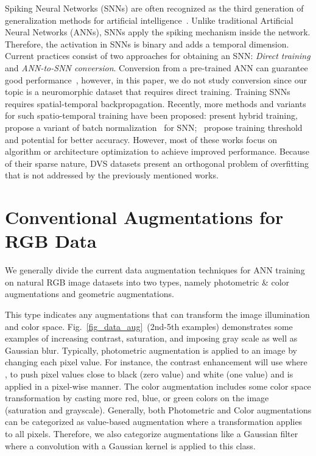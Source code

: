 \documentclass[runningheads]{llncs}
\newcommand{\bftab}{\fontseries{b}\selectfont}
\begin{document}
Spiking Neural Networks (SNNs) are often recognized as the third generation of generalization methods for artificial intelligence~\cite{basegmez2014next}. Unlike traditional Artificial Neural Networks (ANNs), SNNs apply the spiking mechanism inside the network. 
Therefore, the activation in SNNs is binary and adds a temporal dimension. Current practices consist of two approaches for obtaining an SNN: \textit{Direct training} and \textit{ANN-to-SNN conversion}. Conversion from a pre-trained ANN can guarantee good performance~\cite{deng2021optimal,diehl2016conversion,rueckauer2016theory,li2021free,li2022converting,han2020deep}, however, in this paper, we do not study conversion since our topic is a neuromorphic dataset that requires direct training. Training SNNs \cite{wu2019direct,wu2018spatio,hazan2018bindsnet,li2021differentiable,deng2022temporal,guo2022recdis} requires spatial-temporal backpropagation. Recently, more methods and variants for such spatio-temporal training have been proposed: \cite{rathi2020enabling} present hybrid training, \cite{zheng2020going,kim2020revisiting} propose a variant of batch normalization~\cite{ioffe2015batch} for SNN;~\cite{rathi2020diet,fang2021incorporating} propose training threshold and potential for better accuracy. However, most of these works focus on algorithm or architecture optimization to achieve improved performance. Because of their sparse nature, DVS datasets present an orthogonal problem of overfitting that is not addressed by the previously mentioned works.

\section{Conventional Augmentations for RGB Data}
\label{sec_da}

We generally divide the current data augmentation techniques for ANN training on natural RGB image datasets into two types, namely photometric \& color augmentations and geometric augmentations. 

\noindent{\bftab Photometric and Color Augmentations. }
This type indicates any augmentations that can transform the image illumination and color space.  Fig.~\ref{fig_data_aug}~(2nd-5th examples) demonstrates some examples of increasing contrast, saturation, and imposing gray scale as well as Gaussian blur. Typically, photometric augmentation is applied to an image by changing each pixel value. For instance, the contrast enhancement will use  where , to push pixel values close to black (zero value) and white (one value) and is applied in a pixel-wise manner. The color augmentation includes some color space transformation by casting more red, blue, or green colors on the image (\eg saturation and grayscale). 
Generally, both Photometric and Color augmentations can be categorized as value-based augmentation where a transformation  applies to all pixels. Therefore, we also categorize augmentations like a Gaussian filter where a convolution with a Gaussian kernel is applied to this class.  
\end{document}
